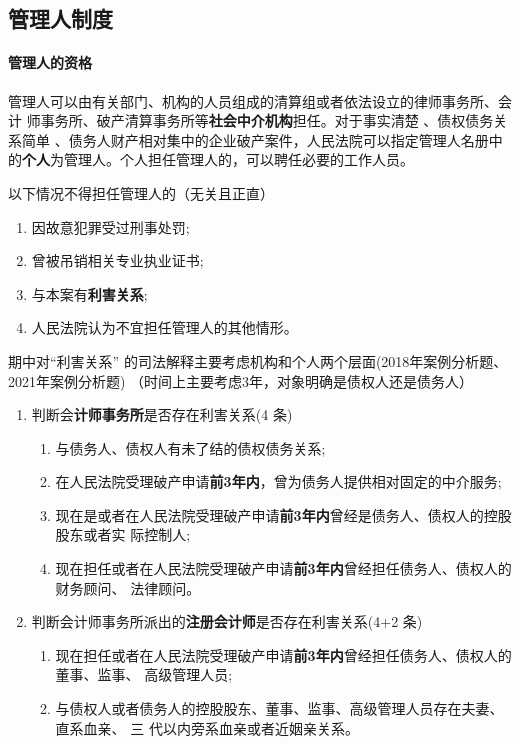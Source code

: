 \documentclass[UTF8,12pt]{ctexart}
\numberwithin{equation}{section} %
\numberwithin{figure}{section}
\numberwithin{table}{section}
\begin{document}
	
	\subsection{管理人制度}
	\paragraph{管理人的资格}
	管理人可以由有关部门、机构的人员组成的清算组或者依法设立的律师事务所、会计 师事务所、破产清算事务所等\textbf{社会中介机构}担任。对于事实清楚 、债权债务关系简单 、债务人财产相对集中的企业破产案件，人民法院可以指定管理人名册中的\textbf{个人}为管理人。个人担任管理人的，可以聘任必要的工作人员。
	
	以下情况不得担任管理人的（无关且正直）
	\begin{enumerate}
		\item 因故意犯罪受过刑事处罚;
		
		\item 曾被吊销相关专业执业证书;
		
		\item 与本案有\textbf{利害关系};
		
		\item 人民法院认为不宜担任管理人的其他情形。
	\end{enumerate}

	期中对“利害关系” 的司法解释主要考虑机构和个人两个层面(2018年案例分析题、2021年案例分析题) （时间上主要考虑3年，对象明确是债权人还是债务人）
	\begin{enumerate}
		\item 判断会\textbf{计师事务所}是否存在利害关系(4 条)
		\begin{enumerate}
			\item  与债务人、债权人有未了结的债权债务关系;
			
			\item 在人民法院受理破产申请\textbf{前3年内}，曾为债务人提供相对固定的中介服务; 
			
			\item 现在是或者在人民法院受理破产申请\textbf{前3年内}曾经是债务人、债权人的控股股东或者实 际控制人;
			
			\item 现在担任或者在人民法院受理破产申请\textbf{前3年内}曾经担任债务人、债权人的财务顾问、 法律顾问。
		\end{enumerate}
		
		\item 判断会计师事务所派出的\textbf{注册会计师}是否存在利害关系(4+2 条) 
		\begin{enumerate}
			\item 现在担任或者在人民法院受理破产申请\textbf{前3年内}曾经担任债务人、债权人的董事、监事、 高级管理人员; 
			
			\item 与债权人或者债务人的控股股东、董事、监事、高级管理人员存在夫妻、直系血亲、 三 代以内旁系血亲或者近姻亲关系。
		\end{enumerate}
	\end{enumerate}
	
\end{document}
